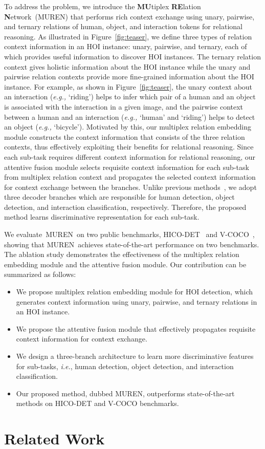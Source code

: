 \documentclass[10pt,twocolumn,letterpaper]{article}
\begin{document}
To address the problem, we introduce the  \textbf{MU}tiplex \textbf{RE}lation \textbf{N}etwork~(MUREN) that performs rich context exchange using unary, pairwise, and ternary relations of human, object, and interaction tokens for relational reasoning.
As illustrated in Figure~\ref{fig:teaser}, we define three types of relation context information in an HOI instance: unary, pairwise, and ternary, each of which provides useful information to discover HOI instances.
The ternary relation context gives holistic information about the HOI instance while the unary and pairwise relation contexts provide more fine-grained information about the HOI instance. For example, as shown in Figure~\ref{fig:teaser}, the unary context about an interaction (\textit{e.g.,} `riding') helps to infer which pair of a human and an object is associated with the interaction in a given image, and the pairwise context between a human and an interaction (\textit{e.g.,} `human' and `riding') helps to detect an object (\textit{e.g.,} `bicycle').
Motivated by this, our multiplex relation embedding module constructs the context information that consists of the three relation contexts, thus effectively exploiting their benefits for relational reasoning.
Since each sub-task requires different context information for relational reasoning, our attentive fusion module selects requisite context information for each sub-task from multiplex relation context and propagates the selected context information for context exchange between the branches.
Unlike previous methods~\cite{kim2021hotr,chen2021asnet,zhang2021cdn,zhou2022distr}, we adopt three decoder branches which are responsible for human detection, object detection, and interaction classification, respectively.
Therefore, the proposed method learns discriminative representation for each sub-task.

We evaluate~MUREN~on two public benchmarks, HICO-DET~\cite{hico} and V-COCO~\cite{vcoco}, showing that MUREN~achieves state-of-the-art performance on two benchmarks.
The ablation study demonstrates the effectiveness of the multiplex relation embedding module and the attentive fusion module.
Our contribution can be summarized as follows:
\begin{itemize}
\item We propose multiplex relation embedding module for HOI detection, which generates context information using unary, pairwise, and ternary relations in an HOI instance.
  \item We propose the attentive fusion module that effectively propagates requisite context information for context exchange.
  \item We design a three-branch architecture to learn more discriminative features for sub-tasks, \textit{i.e.}, human detection, object detection, and interaction classification.
  \item Our proposed method, dubbed MUREN, outperforms state-of-the-art methods on HICO-DET and V-COCO benchmarks.
  
\end{itemize} \section{Related Work}
\end{document}
